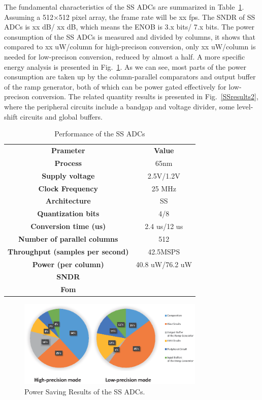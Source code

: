 \documentclass[conference]{IEEEtran}
\begin{document}
The fundamental characteristics of the SS ADCs are summarized in Table~\ref{tab1}. Assuming a 512×512 pixel array, the frame rate will be xx fps. The SNDR of SS ADCs is xx dB/ xx dB, which means the ENOB is 3.x bits/ 7.x bits. The power consumption of the SS ADCs is measured and divided by columns, it shows that compared to xx uW/column for high-precison conversion, only xx uW/column is needed for low-precison conversion, reduced by almost a half. A more specific energy analysis is presented in Fig.~\ref{SSresults1}. As we can see, most parts of the power consumption are taken up by the column-parallel comparators and output buffer of the ramp generator, both of which can be power gated effectively for low-precison conversion. The related quantity results is presented in Fig.~\ref{SSresults2}, where the peripheral circuits include a bandgap and voltage divider, some level-shift circuits and global buffers.
\begin{table}[htbp]
	\caption{Performance of the SS ADCs}
	\begin{center}
		\begin{tabular}{|c|c|}
			\hline
			\textbf{Prameter}& \textbf{Value} \\
			\hhline{|==|}
			\textbf{Process}& 65nm \\
			\hline 
		    \textbf{Supply voltage}& 2.5V/1.2V \\
		    \hline
		    \textbf{Clock Frequency}&	25 MHz \\
		    \hline
		    \textbf{Architecture}&	SS \\
		    \hline
		    \textbf{Quantization bits}&	4/8 \\
		    \hline
		    \textbf{Conversion time (us)}&	2.4 us/12 us \\
		    \hline
		    \textbf{Number of parallel columns}&	512 \\
		    \hline
		    \textbf{Throughput (samples per second)}&	42.5MSPS \\ 
		    \hline
		    \textbf{Power (per column)}&	40.8 uW/76.2 uW \\
		    \hline
		    \textbf{SNDR}& \\
		    \hline
		    \textbf{Fom}& \\
		    \hline	    
		\end{tabular}
		\label{tab1}
	\end{center}
\end{table}
\begin{figure}[htbp]
	\centerline{\includegraphics[width=3.5in]{./Figures/SSResults1.eps}}
	\caption{Power Saving Results of the SS ADCs.}
	\label{SSresults1}
\end{figure}
\end{document}
